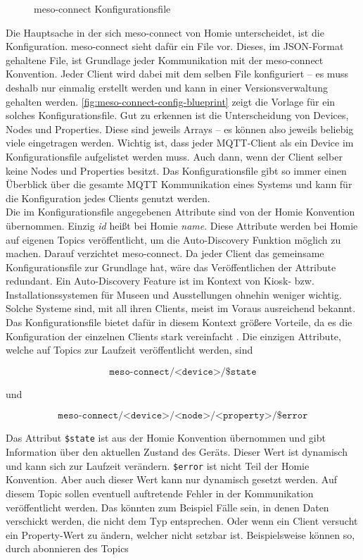 \begin{figure}
  
  \caption{meso-connect Konfigurationsfile}
  \label{fig:meso-connect-config-blueprint}
\end{figure}

Die Hauptsache in der sich meso-connect von Homie unterscheidet, ist die Konfiguration. meso-connect
sieht dafür ein File vor. Dieses, im JSON-Format gehaltene File, ist Grundlage jeder Kommunikation
mit der meso-connect Konvention. Jeder Client wird dabei mit dem selben File konfiguriert -- es muss 
deshalb nur einmalig erstellt werden und kann in einer Versionsverwaltung gehalten werden. 
\autoref{fig:meso-connect-config-blueprint} zeigt die Vorlage für ein solches Konfigurationsfile. 
Gut zu erkennen ist die Unterscheidung von Devices, Nodes und Properties. Diese sind jeweils Arrays --
es können also jeweils beliebig viele eingetragen werden. Wichtig ist, dass jeder MQTT-Client als ein
Device im Konfigurationsfile aufgelistet werden muss. Auch dann, wenn der Client selber 
keine Nodes und Properties besitzt. Das Konfigurationsfile gibt so immer einen Überblick über die 
gesamte MQTT Kommunikation eines Systems und kann für die Konfiguration jedes Clients genutzt werden.\\
Die im Konfigurationsfile angegebenen Attribute sind von der Homie Konvention übernommen. Einzig \emph{id} heißt
bei Homie \emph{name}. Diese Attribute werden bei Homie auf eigenen Topics veröffentlicht, um die 
Auto-Discovery Funktion möglich zu machen. Darauf verzichtet meso-connect. Da jeder Client das gemeinsame
Konfigurationsfile zur Grundlage hat, wäre das Veröffentlichen der Attribute redundant. Ein Auto-Discovery
Feature ist im Kontext von Kiosk- bzw. Installationssystemen für Museen und Ausstellungen ohnehin weniger wichtig.
Solche Systeme sind, mit all ihren Clients, meist im Voraus ausreichend bekannt. Das Konfigurationsfile
bietet dafür in diesem Kontext größere Vorteile, da es die Konfiguration der einzelnen Clients stark
vereinfacht . Die einzigen Attribute, welche auf Topics zur Laufzeit veröffentlicht 
werden, sind

\[\texttt{meso-connect/<device>/\$state} \]

und

\[\texttt{meso-connect/<device>/<node>/<property>/\$error} \]

Das Attribut \texttt{\$state} ist aus der Homie Konvention übernommen und gibt Information über den aktuellen
Zustand des Geräts. Dieser Wert ist dynamisch und kann sich zur Laufzeit verändern. \texttt{\$error} ist nicht 
Teil der Homie Konvention. Aber auch dieser Wert kann nur dynamisch gesetzt werden.
Auf diesem Topic sollen eventuell auftretende Fehler in der Kommunikation veröffentlicht
werden. Das könnten zum Beispiel Fälle sein, in denen Daten verschickt werden, die nicht dem Typ entsprechen.
Oder wenn ein Client versucht ein Property-Wert zu ändern, welcher nicht setzbar ist. Beispielsweise können so,
durch abonnieren des Topics

